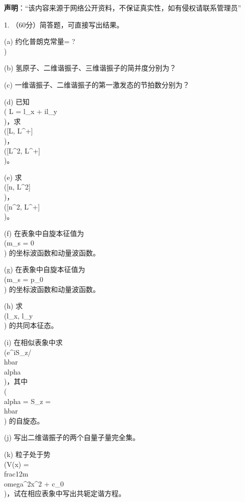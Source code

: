 
\textbf{声明}：“该内容来源于网络公开资料，不保证真实性，如有侵权请联系管理员”

1. （60分）简答题，可直接写出结果。

(a) 约化普朗克常量\hbar = ?\\)

(b) 氢原子、二维谐振子、三维谐振子的简并度分别为？

(c) 一维谐振子、二维谐振子的第一激发态的节拍数分别为？

(d) 已知 \\( L = l_x + il_y \\)，求 \\([L, L^+]\\)， \\([L^2, L^+]\\)。

(e) 求 \\([n, L^2]\\)， \\([n^2, L^+]\\)。

(f) 在表象中自旋本征值为 \\(m_s = 0\\) 的坐标波函数和动量波函数。

(g) 在表象中自旋本征值为 \\(m_s = p_0\\) 的坐标波函数和动量波函数。

(h) 求 \\(l_x, l_y\\) 的共同本征态。

(i) 在相似表象中求 \\(e^{iS_z/\\hbar \\alpha}\\)，其中 \\(\\alpha = S_z = \\hbar\\) 的自旋态。

(j) 写出二维谐振子的两个自量子量完全集。

(k) 粒子处于势 \\(V(x) = \\frac{1}{2}m\\omega^2x^2 + c_0\\)，试在相应表象中写出共轭定谐方程。
